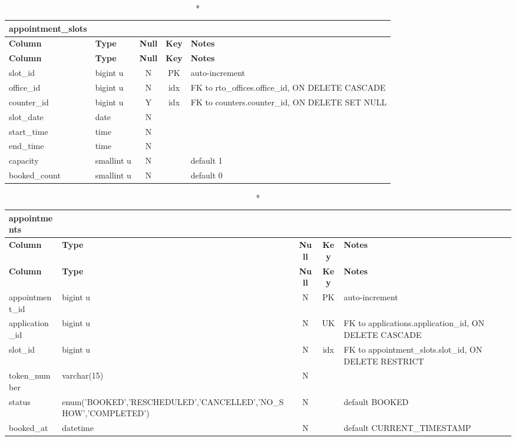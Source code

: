 \vspace{-0.4em}
\begin{longtable}{@{}p{3.4cm}p{2.9cm}c c p{5.6cm}@{}}
\caption*{\textbf{appointment\_\allowbreak{}slots}}\\
\toprule \textbf{Column} & \textbf{Type} & \textbf{Null} & \textbf{Key} & \textbf{Notes} \\ \midrule \endfirsthead
\toprule \textbf{Column} & \textbf{Type} & \textbf{Null} & \textbf{Key} & \textbf{Notes} \\ \midrule \endhead
\bottomrule \endlastfoot
slot\_\allowbreak{}id & bigint u & N & PK & auto-increment \\
office\_\allowbreak{}id & bigint u & N & idx & FK to rto\_\allowbreak{}offices.office\_\allowbreak{}id, ON DELETE CASCADE \\
counter\_\allowbreak{}id & bigint u & Y & idx & FK to counters.counter\_\allowbreak{}id, ON DELETE SET NULL \\
slot\_\allowbreak{}date & date & N &  &  \\
start\_\allowbreak{}time & time & N &  &  \\
end\_\allowbreak{}time & time & N &  &  \\
capacity & smallint u & N &  & default 1 \\
booked\_\allowbreak{}count & smallint u & N &  & default 0 \\
\end{longtable}
\vspace{-0.4em}
\begin{longtable}{@{}p{3.4cm}p{2.9cm}c c p{5.6cm}@{}}
\caption*{\textbf{appointments}}\\
\toprule \textbf{Column} & \textbf{Type} & \textbf{Null} & \textbf{Key} & \textbf{Notes} \\ \midrule \endfirsthead
\toprule \textbf{Column} & \textbf{Type} & \textbf{Null} & \textbf{Key} & \textbf{Notes} \\ \midrule \endhead
\bottomrule \endlastfoot
appointment\_\allowbreak{}id & bigint u & N & PK & auto-increment \\
application\_\allowbreak{}id & bigint u & N & UK & FK to applications.application\_\allowbreak{}id, ON DELETE CASCADE \\
slot\_\allowbreak{}id & bigint u & N & idx & FK to appointment\_\allowbreak{}slots.slot\_\allowbreak{}id, ON DELETE RESTRICT \\
token\_\allowbreak{}number & varchar(15) & N &  &  \\
status & enum('BOOKED',\allowbreak{}'RESCHEDULED',\allowbreak{}'CANCELLED',\allowbreak{}'NO\_\allowbreak{}SHOW',\allowbreak{}'COMPLETED') & N &  & default BOOKED \\
booked\_\allowbreak{}at & datetime & N &  & default CURRENT\_\allowbreak{}TIMESTAMP \\
\end{longtable}
\vspace{-0.4em}
